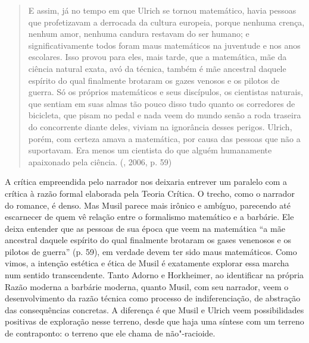 \begin{quote}
E assim, já no tempo em que Ulrich se tornou matemático, havia pessoas
que profetizavam a derrocada da cultura europeia, porque nenhuma crença,
nenhum amor, nenhuma candura restavam do ser humano; e
significativamente todos foram maus matemáticos na juventude e nos anos
escolares. Isso provou para eles, mais tarde, que a matemática, mãe da
ciência natural exata, avó da técnica, também é mãe ancestral daquele
espírito do qual finalmente brotaram os gazes venosos e os pilotos de
guerra. Só os próprios matemáticos e seus discípulos, os cientistas
naturais, que sentiam em suas almas tão pouco disso tudo quanto os
corredores de bicicleta, que pisam no pedal e nada veem do mundo senão a
roda traseira do concorrente diante deles, viviam na ignorância desses
perigos. Ulrich, porém, com certeza amava a matemática, por causa das
pessoas que não a suportavam. Era menos um cientista do que alguém
humanamente apaixonado pela ciência. (, 2006, p. 59)
\end{quote}

A crítica empreendida pelo narrador nos deixaria entrever um paralelo
com a crítica à razão formal elaborada pela Teoria Crítica. O trecho,
como o narrador do romance, é denso. Mas Musil parece mais irônico e
ambíguo, parecendo até escarnecer de quem vê relação entre o formalismo
matemático e a barbárie. Ele deixa entender que as pessoas de sua época
que veem na matemática ``a mãe ancestral daquele espírito do qual
finalmente brotaram os gases venenosos e os pilotos de guerra'' (p. 59),
em verdade devem ter sido maus matemáticos. Como vimos, a intenção
estética e ética de Musil é exatamente explorar essa marcha num sentido
transcendente. Tanto Adorno e Horkheimer, ao identificar na própria
Razão moderna a barbárie moderna, quanto Musil, com seu narrador, veem o
desenvolvimento da razão técnica como processo de indiferenciação, de
abstração das consequências concretas. A diferença é que Musil e Ulrich
veem possibilidades positivas de exploração nesse terreno, desde que
haja uma síntese com um terreno de contraponto: o terreno que ele chama
de não"-racioide.

